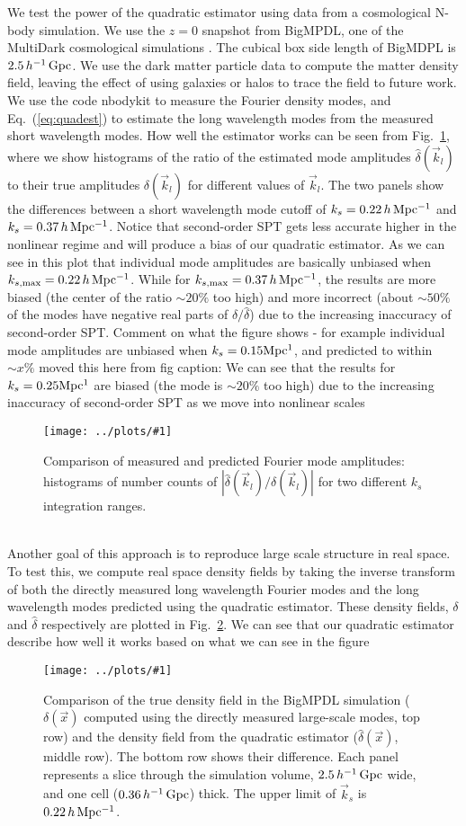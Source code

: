 \documentclass[prd,amsmath,amssymb,floatfix,superscriptaddress,nofootinbib,twocolumn]{revtex4-1}
\newcommand{\vk}{\vec{k}}
\newcommand{\ec}[1]{Eq.~(\ref{eq:#1})}
\newcommand{\rf}[1]{\ref{fig:#1}}
\newcommand{\sfig}[2]{
\texttt{[image: ../plots/\#1]}
        }
\newcommand{\sfigg}[2]{
\texttt{[image: ../plots/\#1]}
        }
\newcommand{\Sfig}[2]{
   \begin{figure}[thbp]
   \begin{center}
    \sfig{../plots/#1.pdf}{\columnwidth}
    \caption{{\small #2}}
    \label{fig:#1}
     \end{center}
   \end{figure}
}
\newcommand{\Sfigg}[2]{
   \begin{figure}[thbp]
    \sfigg{../plots/#1.pdf}{\columnwidth}
    \caption{{\small #2}}
    \label{fig:#1}
   \end{figure}
}
\newcommand{\peikai}[1]{{\color{blue} #1}}
\newcommand{\RC}[1]{{\color{darkorange} #1}}
\begin{document}
\label{sec3}
We test the power of the quadratic estimator using data from a cosmological N-body simulation. We use the $z=0$ snapshot from BigMPDL, one of the MultiDark cosmological simulations \cite{Klypin:2014nov}. The cubical box side length of BigMDPL is $2.5\,h^{-1}\,\rm Gpc$. We use the dark matter particle data to compute the matter density field, leaving the effect of using galaxies or halos to trace the field \cite{Desjacques:2018rev} to  future work.\\ 
We use the code nbodykit \cite{Hand:2018nby} to measure the Fourier density modes, and \ec{quadest} to estimate the long wavelength modes  from the measured short wavelength modes. How well the estimator works can be seen from Fig.~\rf{hist}, where we show histograms of the ratio of the estimated mode amplitudes $\hat{\delta}(\vk_l)$ to their true amplitudes $\delta(\vk_l)$ \peikai{for different values of $\vk_l$}. The two panels show the differences between a short wavelength mode cutoff of $k_s=0.22\, h\, \rm Mpc^{-1}$ and  $k_s=0.37\,h\, \rm Mpc^{-1}$. \peikai{Notice that second-order SPT gets less accurate higher in the nonlinear regime and will produce a bias of our quadratic estimator. As we can see in this plot that individual mode amplitudes are basically unbiased when $k_{s,\rm max}= 0.22\,h\, \rm Mpc^{-1}$. While for $k_{s,\rm max}=0.37\,h\, \rm Mpc^{-1}$, the results are more biased (the center of the ratio $\sim 20 \%$ too high) and more incorrect (about $\sim 50 \%$ of the modes have negative real parts of $\delta/\hat{\delta}$) due to the increasing inaccuracy of second-order SPT. } \RC{Comment on what the figure shows -  for example individual mode amplitudes are unbiased when $k_s= 0.15 \rm Mpc^{1}$, and predicted to within $\sim x \%$} \RC{moved this here from fig caption: We can see that the results for $k_s=0.25 \rm Mpc^{1}$ are biased (the mode is $\sim 20 \%$ too high) due to the increasing inaccuracy of second-order SPT as we move into nonlinear scales}
\Sfig{hist}{Comparison of measured and predicted Fourier mode amplitudes: histograms of number counts of $|\hat{\delta}(\vk_l)/\delta(\vk_l)|$ for two different $k_s$ integration ranges.}
\\Another goal of this approach is to reproduce large scale structure in real space. To test this, we compute real space density fields by taking the inverse transform of both the directly measured long wavelength Fourier modes and the long wavelength modes predicted using the quadratic estimator. These density fields, $\delta$ and $\hat{\delta}$ respectively are plotted in Fig.~\rf{real}. We can see that \peikai{our quadratic estimator }
\RC{describe how well it works based on what we can see in the figure}
\Sfigg{real}{Comparison of the true density field in the BigMPDL simulation ($\delta(\vec{x})$ computed using the directly measured large-scale modes, top row) and the density field from the quadratic estimator ($\hat{\delta}(\vec{x})$, middle row). The bottom row shows their difference. Each panel represents a slice through the simulation volume,  $2.5 \,h^{-1}\,\rm Gpc$ wide, and one cell ($0.36 \,h^{-1}\,\rm Gpc$) thick.  The upper limit of $\vk_s$ is $0.22 \,h\, \rm Mpc^{-1}$.}
\end{document}
